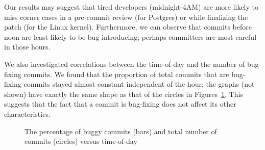 Our results may suggest that tired developers (midnight-4AM) are more
likely to miss corner cases in a pre-commit review (for Postgres) or
while finalizing the patch (for the Linux kernel). Furthermore, we can observe
that commits before noon are least likely to be bug-introducing;
perhaps committers are most careful in those hours.

We also investigated correlations between the time-of-day and the
number of bug-fixing commits. We found that the proportion of total
commits that are bug-fixing commits stayed almost constant independent
of the hour; the graphs (not shown) have exactly the same shape as
that of the circles in Figures~\ref{fig-bugginess-hour}.
This suggests that the fact
that a commit is bug-fixing does not affect its other characteristics.

\begin{figure}[tbh]
\centering
{}
\caption{The percentage of buggy commits (bars) and total number of commits (circles) versus time-of-day}
\label{fig-bugginess-hour} %
\end{figure}

